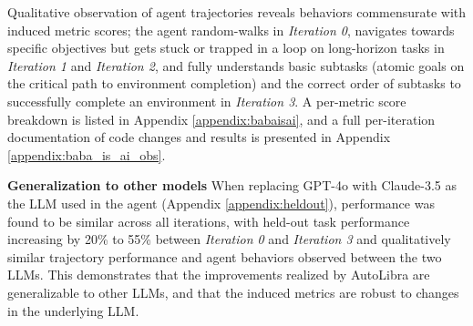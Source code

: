 
Qualitative observation of agent trajectories reveals behaviors commensurate with induced metric scores; the agent random-walks in \textit{Iteration 0}, navigates towards specific objectives but gets stuck or trapped in a loop on long-horizon tasks in \textit{Iteration 1} and \textit{Iteration 2}, and fully understands basic subtasks (atomic goals on the critical path to environment completion) and the correct order of subtasks to successfully complete an environment in \textit{Iteration 3}. A per-metric score breakdown is listed in Appendix \ref{appendix:babaisai}, and a full per-iteration documentation of code changes and results is presented in Appendix \ref{appendix:baba_is_ai_obs}.




\textbf{Generalization to other models} When replacing GPT-4o with Claude-3.5 as the LLM used in the agent (Appendix \ref{appendix:heldout}), performance was found to be similar across all iterations, with held-out task performance increasing by 20\% to 55\% between \textit{Iteration 0} and \textit{Iteration 3} and qualitatively similar trajectory performance and agent behaviors observed between the two LLMs. This demonstrates that the improvements realized by AutoLibra are generalizable to other LLMs, and that the induced metrics are robust to changes in the underlying LLM.


